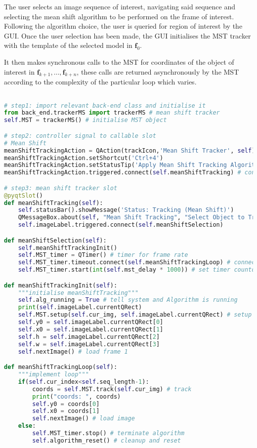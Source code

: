 The user selects an image sequence of interest, navigating said
sequence and selecting the mean shift algorithm to be performed on the frame of
interest.
Following the algorithm choice, the user is queried for region of interest by
the GUI\@. Once the user selection has been made, the GUI initialises the MST
tracker with the template of the selected model in $\mathbf{f}_0$.

It then makes synchronous calls to the MST for coordinates of the object of
interest in $\mathbf{f}_{k+1},\ldots,\mathbf{f}_{k+n}$, these calls are returned
asynchronously by the MST according to the complexity of the particular loop
which varies.




\begin{lstlisting}[language=Python, caption={Mean shift tracker integration in
GUI}, captionpos=b, label={lst:integration}]

# step1: import relevant back-end class and initialise it
from back_end.trackerMS import trackerMS # mean shift tracker
self.MST = trackerMS() # initialise MST object

# step2: controller signal to callable slot
# Mean Shift
meanShiftTrackingAction = QAction(trackIcon,'Mean Shift Tracker', self)
meanShiftTrackingAction.setShortcut('Ctrl+4')
meanShiftTrackingAction.setStatusTip('Apply Mean Shift Tracking Algorithm')
meanShiftTrackingAction.triggered.connect(self.meanShiftTracking) # connect to slot

# step3: mean shift tracker slot
@pyqtSlot()
def meanShiftTracking(self):
    self.statusBar().showMessage('Status: Tracking (Mean Shift)')
    QMessageBox.about(self, "Mean Shift Tracking", "Select Object to Track")
    self.imageLabel.triggered.connect(self.meanShiftSelection)

def meanShiftSelection(self):
    self.meanShiftTrackingInit()
    self.MST_timer = QTimer() # timer for frame rate
    self.MST_timer.timeout.connect(self.meanShiftTrackingLoop) # connect timeouts MSloop
    self.MST_timer.start(int(self.mst_delay * 1000)) # set timer countdown rate

def meanShiftTrackingInit(self):
    """initialise meanShiftTracking"""
    self.alg_running = True # tell system and Algorithm is running
    print(self.imageLabel.currentQRect)
    self.MST.setup(self.cur_img, self.imageLabel.currentQRect) # setup mean shift tracker with coords
    self.y0 = self.imageLabel.currentQRect[0]
    self.x0 = self.imageLabel.currentQRect[1]
    self.h = self.imageLabel.currentQRect[2]
    self.w = self.imageLabel.currentQRect[3]
    self.nextImage() # load frame 1

def meanShiftTrackingLoop(self):
    """implement loop"""   
    if(self.cur_index<self.seq_length-1):
        coords = self.MST.track(self.cur_img) # track    
        print("coords: ", coords)
        self.y0 = coords[0]
        self.x0 = coords[1]
        self.nextImage() # load image    
    else:
        self.MST_timer.stop() # terminate algorithm
        self.algorithm_reset() # cleanup and reset
\end{lstlisting}

